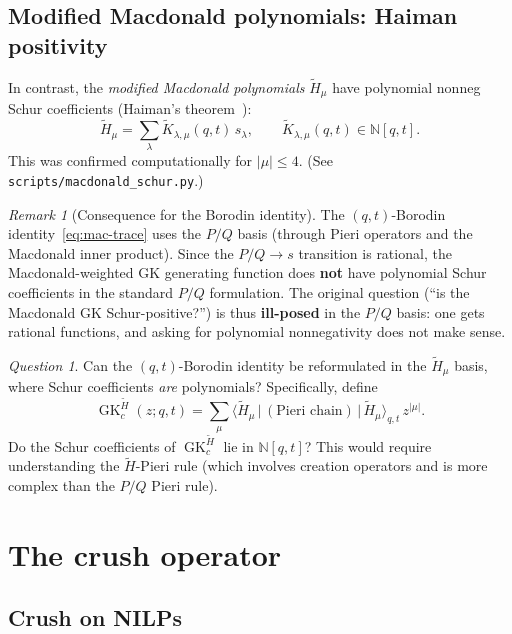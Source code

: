 \documentclass[11pt]{article}
\theoremstyle{plain}
\theoremstyle{definition}
\theoremstyle{remark}
\newtheorem{remark}[theorem]{Remark}
\newtheorem{question}[theorem]{Question}
\newcommand{\N}{\mathbb{N}}
\newcommand{\GK}{\operatorname{GK}}
\begin{document}
\subsection{Modified Macdonald polynomials: Haiman positivity}

In contrast, the \emph{modified Macdonald polynomials}
$\tilde{H}_\mu$ have polynomial nonneg Schur coefficients
(Haiman's theorem~\cite{haiman-2001}):
\begin{equation}\label{eq:haiman}
  \tilde{H}_\mu = \sum_\lambda
  \tilde{K}_{\lambda,\mu}(q,t)\, s_\lambda,
  \qquad \tilde{K}_{\lambda,\mu}(q,t) \in \N[q,t].
\end{equation}
This was confirmed computationally for $|\mu| \leq 4$.
(See \texttt{scripts/macdonald\_schur.py}.)

\begin{remark}[Consequence for the Borodin identity]
The $(q,t)$-Borodin identity~\eqref{eq:mac-trace} uses the
$P/Q$ basis (through Pieri operators and the Macdonald inner
product). Since the $P/Q \to s$ transition is rational, the
Macdonald-weighted GK generating function does \textbf{not}
have polynomial Schur coefficients in the standard $P/Q$
formulation. The original question
(``is the Macdonald GK Schur-positive?'') is thus
\textbf{ill-posed} in the $P/Q$ basis: one gets rational
functions, and asking for polynomial nonnegativity does not
make sense.
\end{remark}

\begin{question}\label{q:mac-Ht}
Can the $(q,t)$-Borodin identity be reformulated in the
$\tilde{H}_\mu$ basis, where Schur coefficients \emph{are}
polynomials?
Specifically, define
\[
  \GK_c^{\tilde{H}}(z;q,t)
  = \sum_\mu \langle \tilde{H}_\mu \,|\,
  (\text{Pieri chain}) \,|\, \tilde{H}_\mu \rangle_{q,t}\,
  z^{|\mu|}.
\]
Do the Schur coefficients of
$\GK_c^{\tilde{H}}$ lie in $\N[q,t]$?
This would require understanding the $\tilde{H}$-Pieri rule
(which involves creation operators and is more complex than
the $P/Q$ Pieri rule).
\end{question}


\section{The crush operator}
\label{sec:crush}

\subsection{Crush on NILPs}
\label{sec:crush-nilp}
\end{document}
